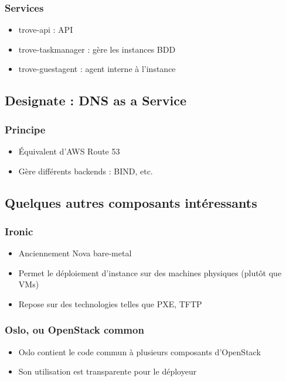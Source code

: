   \begin{frame}
    \frametitle{Services}
    \begin{itemize}
      \item trove-api : API
      \item trove-taskmanager : gère les instances BDD
      \item trove-guestagent : agent interne à l'instance
    \end{itemize}
  \end{frame}

  \subsection[Designate]{Designate : DNS as a Service}

  \begin{frame}
    \frametitle{Principe}
    \begin{itemize}
      \item Équivalent d'AWS Route 53
      \item Gère différents backends : BIND, etc.
    \end{itemize}
  \end{frame}

  \subsection[Les autres]{Quelques autres composants intéressants}

  \begin{frame}
    \frametitle{Ironic}
    \begin{itemize}
      \item Anciennement Nova bare-metal
      \item Permet le déploiement d'instance sur des machines physiques (plutôt que VMs)
      \item Repose sur des technologies telles que PXE, TFTP
    \end{itemize}
  \end{frame}

  \begin{frame}
    \frametitle{Oslo, ou OpenStack common}
    \begin{itemize}
      \item Oslo contient le code commun à plusieurs composants d'OpenStack
      \item Son utilisation est transparente pour le déployeur
    \end{itemize}
  \end{frame}

